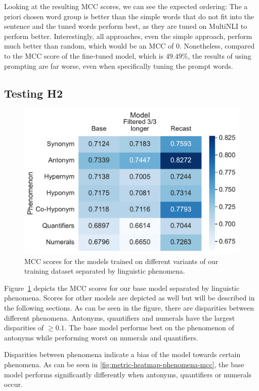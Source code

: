 Looking at the resulting \ac{MCC} scores, we can see the expected ordering: The a priori chosen word group is better than the simple words that do not fit into the sentence and the tuned words perform best, as they are tuned on \ac{MultiNLI} to perform better. Interestingly, all approaches, even the simple approach, perform much better than random, which would be an \ac{MCC} of $0$. Nonetheless, compared to the \ac{MCC} score of the fine-tuned model, which is $49.49\%$, the results of using prompting are far worse, even when specifically tuning the prompt words.

\subsection{Testing H2}
\begin{figure}[ht]
    \centering
    \includegraphics[width=0.9\columnwidth]{./images/metric_heatmaps_phenomena/all_words/base_filtered_recast_matthews_correlation.pdf}
    \caption{\ac{MCC} scores for the models trained on different variants of our training dataset separated by linguistic phenomena.}
    \label{fig:metric-heatmap-phenomena-mcc}
\end{figure}

Figure~\ref{fig:metric-heatmap-phenomena-mcc} depicts the \acs{MCC} scores for our base model separated by linguistic phenomena. Scores for other models are depicted as well but will be described in the following sections. As can be seen in the figure, there are disparities between different phenomena. Antonyms, quantifiers and numerals have the largest disparities of $\geq 0.1$. The base model performs best on the phenomenon of antonyms while performing worst on numerals and quantifiers.

Disparities between phenomena indicate a bias of the model towards certain phenomena. As can be seen in \autoref{fig:metric-heatmap-phenomena-mcc}, the base model performs significantly differently when antonyms, quantifiers or numerals occur.


